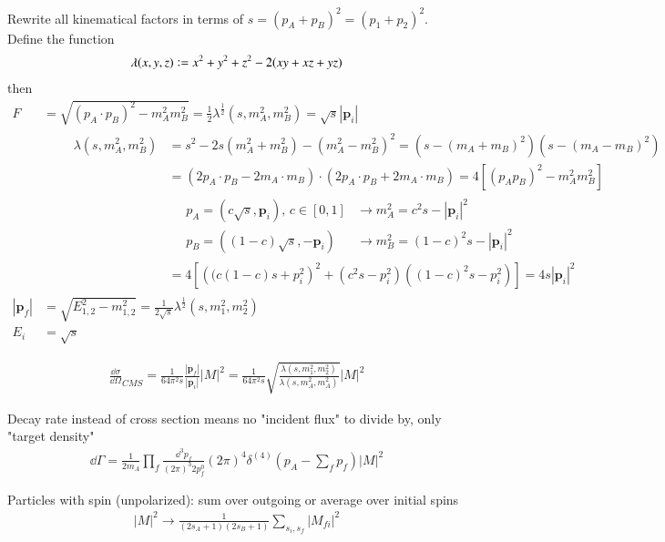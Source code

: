 Rewrite all kinematical factors in terms of $s=(p_A+p_B)^2=(p_1+p_2)^2$. Define the function
\begin{align}
	\lambda(x,y,z) \vcentcolon = x^2 + y^2 +z^2 -2(xy + xz + yz)
\end{align}
then
\begin{align*}
	F &= \sqrt{(p_A\cdot p_B)^2 - m_A^2 m_B^2} = \frac{1}{2} \lambda^{\frac{1}{2}}(s,m^2_A,m^2_B) = \sqrt{s} |\pmb{p}_i| \\
	  &\qquad \boxed{ \begin{array}{ll}
			  \lambda (s,m_A^2, m_B^2) &= s^2 -2s(m_A^2 + m_B^2)-(m_A^2 - m_B^2)^2 =  (s - (m_A + m_B)^2)(s - (m_A - m_B)^2) \\
									   &= (2p_A \cdot p_B -2 m_A\cdot m_B) \cdot (2p_A \cdot p_B + 2 m_A\cdot m_B) = 4 \left[ (p_A p_B)^2 - m_A^2 m_B^2 \right]  \\
									   &\quad \boxed{ 
					   \begin{array}{ll}
						   p_A = (c\sqrt{s}, \pmb{p}_i),\, c \in [0,1] &\rightarrow m^2_A = c^2s - |\pmb{p}_i|^2 \\
						   p_B = ((1-c)\sqrt{s}, -\pmb{p}_i) &\rightarrow m^2_B = (1-c)^2 s - |\pmb{p}_i|^2
						\end{array}
					} \\
									   & =4 \left[ \left((c(1-c)s + p_i^2 \right)^2 + (c^2s - p_i^2)((1-c)^2s - p_i^2)\right] = 4 s |\pmb{p}_i|^2
	  \end{array} } \\
	|\pmb{p}_f| &= \sqrt{E^2_{1,2} - m_{1,2}^2} = \frac{1}{2\sqrt{s}} \lambda^{\frac{1}{2}}(s, m_1^2, m_2^2) \\
	E_i & = \sqrt{s}
\end{align*}

\begin{align}
	\frac{\dd \sigma}{\dd \Omega}_{CMS} = \frac{1}{64 \pi^2 s} \frac{|\pmb{p}_f|}{|\pmb{p}_i|}|M|^2 = \frac{1}{64\pi^2 s} \sqrt{\frac{\lambda(s, m_1^2, m_2^2)}{\lambda(s, m_A^2, m_A^2)}} |M|^2
\end{align}

Decay rate instead of cross section means no "incident flux" to divide by, only "target density"
\begin{align}
	\dd \Gamma = \frac{1}{2m_A} \prod_f \frac{\dd^3 p_f}{(2\pi)^3 2p_f^0} (2\pi)^4 \delta^{(4)}(p_A - \sum_f p_f) |M|^2
\end{align}

Particles with spin (unpolarized): sum over outgoing or average over initial spins
\begin{align}
	|M|^2 \rightarrow \frac{1}{(2s_A + 1)(2s_B + 1)} \sum_{s_i, s_f} |M_{fi}|^2
\end{align}

